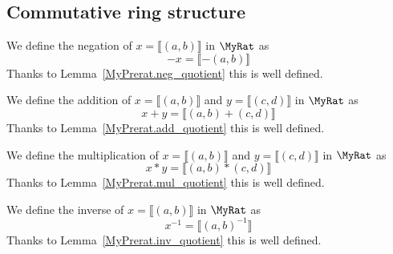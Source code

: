 \subsection{Commutative ring structure}

\begin{definition}
    \label{MyRat.neg}
    \leanok
We define the negation of $x = ⟦ (a, b) ⟧$ in $\MyRat$ as
\[
-x = ⟦ -(a, b) ⟧
\]
Thanks to Lemma~\ref{MyPrerat.neg_quotient} this is well defined.
\end{definition}

\begin{definition}
    \label{MyRat.add}
    \leanok
We define the addition of $x = ⟦ (a, b) ⟧$ and $y = ⟦ (c, d) ⟧$ in $\MyRat$ as
\[
x + y = ⟦ (a,b)+(c,d) ⟧
\]
Thanks to Lemma~\ref{MyPrerat.add_quotient} this is well defined.
\end{definition}

\begin{definition}
    \label{MyRat.mul}
    \leanok
We define the multiplication of $x = ⟦ (a, b) ⟧$ and $y = ⟦ (c, d) ⟧$ in $\MyRat$ as
\[
x * y = ⟦ (a, b)*(c,d) ⟧
\]
Thanks to Lemma~\ref{MyPrerat.mul_quotient} this is well defined.
\end{definition}

\begin{definition}
    \label{MyRat.inv}
    \leanok
We define the inverse of $x = ⟦ (a, b) ⟧$ in $\MyRat$ as
\[
x^{-1} = ⟦ (a, b)^{-1} ⟧
\]
Thanks to Lemma~\ref{MyPrerat.inv_quotient} this is well defined.
\end{definition}

